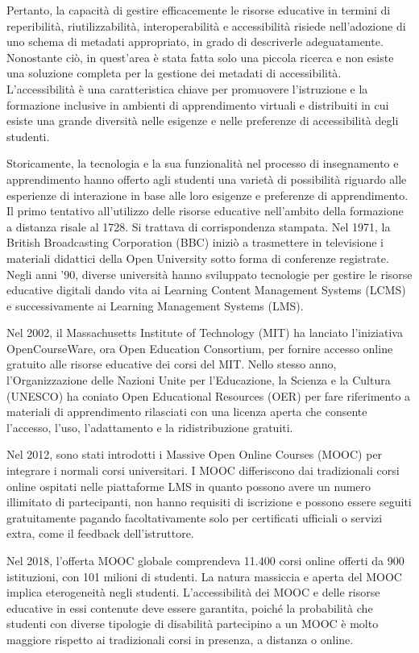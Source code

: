 Pertanto, la capacità di gestire efficacemente le risorse educative in termini di reperibilità, riutilizzabilità, interoperabilità e accessibilità risiede nell'adozione di uno schema di metadati appropriato, in grado di descriverle adeguatamente. Nonostante ciò, in quest'area è stata fatta solo una piccola ricerca e non esiste una soluzione completa per la gestione dei metadati di accessibilità. L'accessibilità è una caratteristica chiave per promuovere l'istruzione e la formazione inclusive in ambienti di apprendimento virtuali e distribuiti in cui esiste una grande diversità nelle esigenze e nelle preferenze di accessibilità degli studenti.

Storicamente, la tecnologia e la sua funzionalità nel processo di insegnamento e apprendimento hanno offerto agli studenti una varietà di possibilità riguardo alle esperienze di interazione in base alle loro esigenze e preferenze di apprendimento. Il primo tentativo all'utilizzo delle risorse educative nell'ambito della formazione a distanza risale al 1728. Si trattava di corrispondenza stampata. Nel 1971, la British Broadcasting Corporation (BBC) iniziò a trasmettere in televisione i materiali didattici della Open University sotto forma di conferenze registrate. Negli anni '90, diverse università hanno sviluppato tecnologie per gestire le risorse educative digitali dando vita ai Learning Content Management Systems (LCMS) e successivamente ai Learning Management Systems (LMS).

Nel 2002, il Massachusetts Institute of Technology (MIT) ha lanciato l'iniziativa OpenCourseWare, ora Open Education Consortium, per fornire accesso online gratuito alle risorse educative dei corsi del MIT. Nello stesso anno, l'Organizzazione delle Nazioni Unite per l'Educazione, la Scienza e la Cultura (UNESCO) ha coniato Open Educational Resources (OER) per fare riferimento a materiali di apprendimento rilasciati con una licenza aperta che consente l'accesso, l'uso, l'adattamento e la ridistribuzione gratuiti.

Nel 2012, sono stati introdotti i Massive Open Online Courses (MOOC) per integrare i normali corsi universitari. I MOOC differiscono dai tradizionali corsi online ospitati nelle piattaforme LMS in quanto possono avere un numero illimitato di partecipanti, non hanno requisiti di iscrizione e possono essere seguiti gratuitamente pagando facoltativamente solo per certificati ufficiali o servizi extra, come il feedback dell'istruttore.

Nel 2018, l'offerta MOOC globale comprendeva 11.400 corsi online offerti da 900 istituzioni, con 101 milioni di studenti. La natura massiccia e aperta del MOOC implica eterogeneità negli studenti. L'accessibilità dei MOOC e delle risorse educative in essi contenute deve essere garantita, poiché la probabilità che studenti con diverse tipologie di disabilità partecipino a un MOOC è molto maggiore rispetto ai tradizionali corsi in presenza, a distanza o online. 

